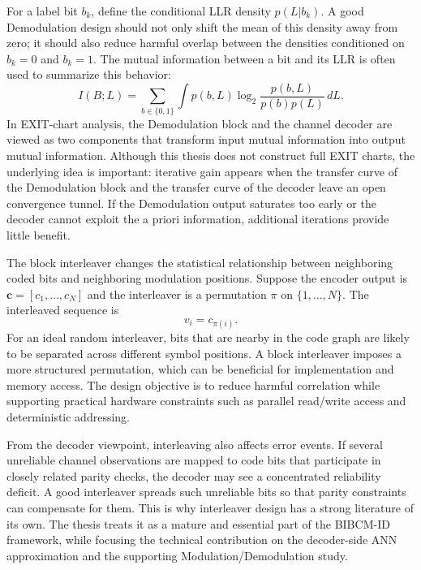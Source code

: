 For a label bit $b_k$, define the conditional LLR density $p(L|b_k)$. A good Demodulation design should not only shift the mean of this density away from zero; it should also reduce harmful overlap between the densities conditioned on $b_k=0$ and $b_k=1$. The mutual information between a bit and its LLR is often used to summarize this behavior:
\begin{equation}
  I(B;L)=
  \sum_{b\in\{0,1\}}\int p(b,L)
  \log_2\frac{p(b,L)}{p(b)p(L)}\,dL.
\end{equation}
In EXIT-chart analysis, the Demodulation block and the channel decoder are viewed as two components that transform input mutual information into output mutual information. Although this thesis does not construct full EXIT charts, the underlying idea is important: iterative gain appears when the transfer curve of the Demodulation block and the transfer curve of the decoder leave an open convergence tunnel. If the Demodulation output saturates too early or the decoder cannot exploit the a priori information, additional iterations provide little benefit.

The block interleaver changes the statistical relationship between neighboring coded bits and neighboring modulation positions. Suppose the encoder output is $\mathbf{c}=[c_1,\ldots,c_N]$ and the interleaver is a permutation $\pi$ on $\{1,\ldots,N\}$. The interleaved sequence is
\begin{equation}
  v_i=c_{\pi(i)}.
\end{equation}
For an ideal random interleaver, bits that are nearby in the code graph are likely to be separated across different symbol positions. A block interleaver imposes a more structured permutation, which can be beneficial for implementation and memory access. The design objective is to reduce harmful correlation while supporting practical hardware constraints such as parallel read/write access and deterministic addressing.

From the decoder viewpoint, interleaving also affects error events. If several unreliable channel observations are mapped to code bits that participate in closely related parity checks, the decoder may see a concentrated reliability deficit. A good interleaver spreads such unreliable bits so that parity constraints can compensate for them. This is why interleaver design has a strong literature of its own. The thesis treats it as a mature and essential part of the BIBCM-ID framework, while focusing the technical contribution on the decoder-side ANN approximation and the supporting Modulation/Demodulation study.

